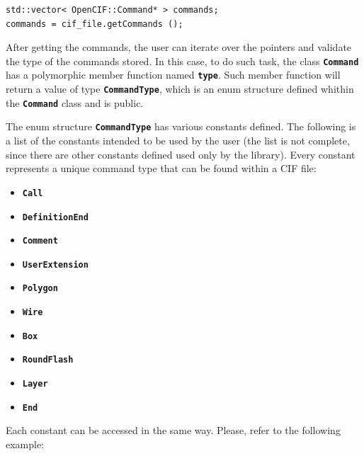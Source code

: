 \documentclass[11pt,twoside,openany,x11names,svgnames]{memoir}
\begin{document}
\begin{lstlisting}[frame=single,style=CPPStyle]
std::vector< OpenCIF::Command* > commands;
commands = cif_file.getCommands ();
\end{lstlisting}

After getting the commands, the user can iterate over the pointers and validate the type of the commands stored. In this case, to do such task, the class \textbf{\texttt{Command}} has a polymorphic member function named \textbf{\texttt{type}}. Such member function will return a value of type \textbf{\texttt{CommandType}}, which is an enum structure defined whithin the \textbf{\texttt{Command}} class and is public.

The enum structure \textbf{\texttt{CommandType}} has various constants defined. The following is a list of the constants intended to be used by the user (the list is not complete, since there are other constants defined used only by the library). Every constant represents a unique command type that can be found within a CIF file:

\begin{itemize}
	\item \textbf{\texttt{Call}}
	\item \textbf{\texttt{DefinitionEnd}}
	\item \textbf{\texttt{Comment}}
	\item \textbf{\texttt{UserExtension}}
	\item \textbf{\texttt{Polygon}}
	\item \textbf{\texttt{Wire}}
	\item \textbf{\texttt{Box}}
	\item \textbf{\texttt{RoundFlash}}
	\item \textbf{\texttt{Layer}}
	\item \textbf{\texttt{End}}
\end{itemize}

Each constant can be accessed in the same way. Please, refer to the following example:
\end{document}
